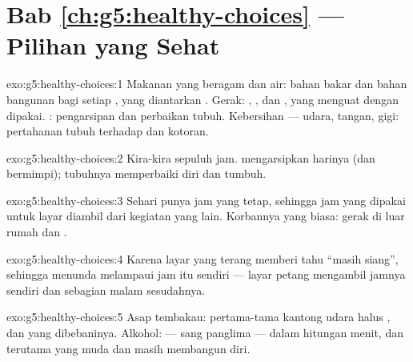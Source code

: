 \section*{Bab \ref{ch:g5:healthy-choices} --- Pilihan yang Sehat}

\begin{solution}{exo:g5:healthy-choices:1}
Makanan yang beragam dan air: bahan bakar dan bahan bangunan bagi
setiap , yang diantarkan . Gerak: , ,  dan
, yang menguat dengan dipakai. : pengarsipan  dan
perbaikan tubuh. Kebersihan --- udara, tangan, gigi: pertahanan tubuh
terhadap  dan kotoran.
\end{solution}

\begin{solution}{exo:g5:healthy-choices:2}
Kira-kira sepuluh jam.  mengarsipkan harinya (dan bermimpi);
tubuhnya memperbaiki diri dan tumbuh.
\end{solution}

\begin{solution}{exo:g5:healthy-choices:3}
Sehari punya jam yang tetap, sehingga jam yang dipakai untuk layar
diambil dari kegiatan yang lain. Korbannya yang biasa: gerak di luar
rumah dan .
\end{solution}

\begin{solution}{exo:g5:healthy-choices:4}
Karena layar yang terang memberi tahu  ``masih siang'', sehingga
menunda  melampaui jam itu sendiri --- layar petang mengambil
jamnya sendiri dan sebagian malam sesudahnya.
\end{solution}

\begin{solution}{exo:g5:healthy-choices:5}
Asap tembakau: pertama-tama kantong udara halus , dan 
yang dibebaninya. Alkohol:  --- sang panglima --- dalam hitungan
menit, dan terutama  yang muda dan masih membangun diri.
\end{solution}

